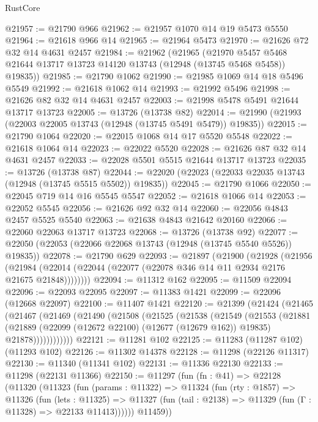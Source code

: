 \begin{lexlean}{RustCore}
\begin{coremodule}
@21957 := @21790 @966
@21962 := @21957 @1070 @14 @19 @5473 @5550
@21964 := @21618 @966 @14
@21965 := @21964 @5473
@21970 := @21626 @72 @32 @14 @4631 @2457
@21984 := @21962
    (@21965
      (@21970 @5457 @5468 @21644 @13717 @13723 @14120 @13743 (@12948 (@13745 @5468 @5458)) @19835))
@21985 := @21790 @1062
@21990 := @21985 @1069 @14 @18 @5496 @5549
@21992 := @21618 @1062 @14
@21993 := @21992 @5496
@21998 := @21626 @82 @32 @14 @4631 @2457
@22003 := @21998 @5478 @5491 @21644 @13717 @13723
@22005 := @13726 (@13738 @82)
@22014 := @21990 (@21993 (@22003 @22005 @13743 (@12948 (@13745 @5491 @5479)) @19835))
@22015 := @21790 @1064
@22020 := @22015 @1068 @14 @17 @5520 @5548
@22022 := @21618 @1064 @14
@22023 := @22022 @5520
@22028 := @21626 @87 @32 @14 @4631 @2457
@22033 := @22028 @5501 @5515 @21644 @13717 @13723
@22035 := @13726 (@13738 @87)
@22044 := @22020 (@22023 (@22033 @22035 @13743 (@12948 (@13745 @5515 @5502)) @19835))
@22045 := @21790 @1066
@22050 := @22045 @719 @14 @16 @5545 @5547
@22052 := @21618 @1066 @14
@22053 := @22052 @5545
@22056 := @21626 @92 @32 @14
@22060 := @22056 @4843 @2457 @5525 @5540
@22063 := @21638 @4843 @21642 @20160
@22066 := @22060 @22063 @13717 @13723
@22068 := @13726 (@13738 @92)
@22077 := @22050 (@22053 (@22066 @22068 @13743 (@12948 (@13745 @5540 @5526)) @19835))
@22078 := @21790 @629
@22093 := @21897
    (@21900
      (@21928
        (@21956
          (@21984 (@22014 (@22044 (@22077 (@22078 @346 @14 @11 @2934 @2176 @21675 @21848))))))))
@22094 := @11312 @162
@22095 := @11509 @22094
@22096 := @22093 @22095
@22097 := @11383 @1421
@22099 := @22096 (@12668 @22097)
@22100 := @11407 @1421
@22120 := @21399
    (@21424
      (@21465
        (@21467
          (@21469
            (@21490
              (@21508
                (@21525
                  (@21538
                    (@21549
                      (@21553
                        (@21881
                          (@21889
                            (@22099 (@12672 @22100) (@12677 (@12679 @162)) @19835)
                            @21878))))))))))))
@22121 := @11281 @102
@22125 := @11283 (@11287 @102) (@11293 @102)
@22126 := @11302 @14378
@22128 := @11298 (@22126 @11317)
@22130 := @11340 (@11341 @102)
@22131 := @11336 @22130
@22133 := @11298 (@22131 @11366)
@22150 := @11297
    (fun (fn : @41) =>
    @22128
      (@11320
        (@11323
          (fun (params : @11322) =>
          @11324
            (fun (rty : @1857) =>
            @11326
              (fun (lets : @11325) =>
              @11327 (fun (tail : @2138) => @11329 (fun (Γ : @11328) => @22133 @11413))))))
        @11459))

\end{coremodule}
\end{lexlean}
